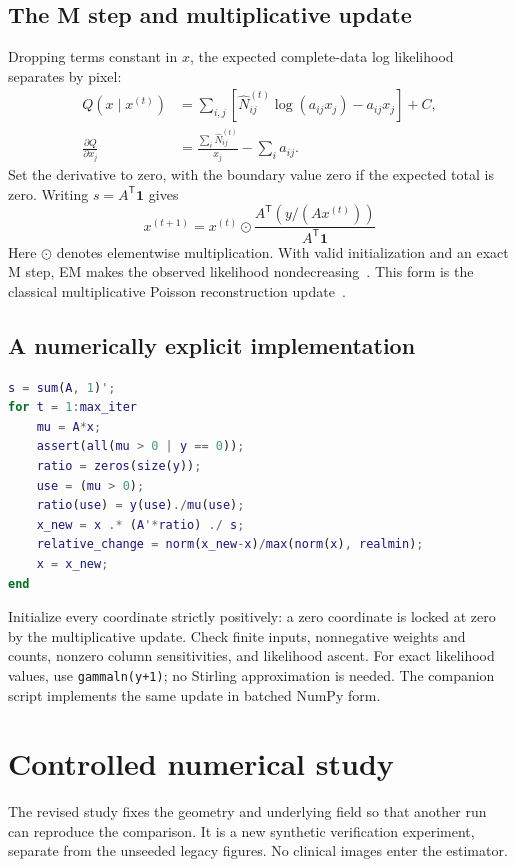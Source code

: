 \documentclass[11pt,a4paper]{article}
\newcommand{\ones}{\mathbf 1}
\newcommand{\sectionpage}[2]{\clearpage\section{#1}\label{#2}}
\begin{document}
\subsection*{The M step and multiplicative update}
Dropping terms constant in $x$, the expected complete-data log likelihood separates by pixel:
\begin{align}
 Q(x\mid x^{(t)})&=\sum_{i,j}\left[\widehat N_{ij}^{(t)}\log(a_{ij}x_j)-a_{ij}x_j\right]+C,\\
 \frac{\partial Q}{\partial x_j}&=\frac{\sum_i\widehat N_{ij}^{(t)}}{x_j}-\sum_i a_{ij}.
\end{align}
Set the derivative to zero, with the boundary value zero if the expected total is zero. Writing $s=A^\mathsf T\ones$ gives
\begin{equation}
 \boxed{\quad x^{(t+1)}=x^{(t)}\odot
 \frac{A^\mathsf T\!\left(y/(Ax^{(t)})\right)}{A^\mathsf T\ones}\quad}
 \label{eq:em}
\end{equation}
Here $\odot$ denotes elementwise multiplication. With valid initialization and an exact M step, EM makes the observed likelihood nondecreasing~\cite{dempster}. This form is the classical multiplicative Poisson reconstruction update~\cite{shepp}.

\subsection*{A numerically explicit implementation}
\begin{lstlisting}[language=Matlab]
% A is m-by-n, y and x are column vectors; s > 0.
s = sum(A, 1)';
for t = 1:max_iter
    mu = A*x;
    assert(all(mu > 0 | y == 0));
    ratio = zeros(size(y));
    use = (mu > 0);
    ratio(use) = y(use)./mu(use);
    x_new = x .* (A'*ratio) ./ s;
    relative_change = norm(x_new-x)/max(norm(x), realmin);
    x = x_new;
end
\end{lstlisting}
Initialize every coordinate strictly positively: a zero coordinate is locked at zero by the multiplicative update. Check finite inputs, nonnegative weights and counts, nonzero column sensitivities, and likelihood ascent. For exact likelihood values, use \texttt{gammaln(y+1)}; no Stirling approximation is needed. The companion script implements the same update in batched NumPy form.

\sectionpage{Controlled numerical study}{sec:study}
The revised study fixes the geometry and underlying field so that another run can reproduce the comparison. It is a new synthetic verification experiment, separate from the unseeded legacy figures. No clinical images enter the estimator.
\end{document}
